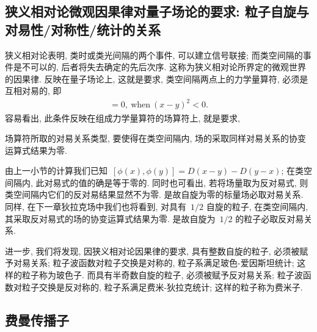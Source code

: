 \subsection{狭义相对论微观因果律对量子场论的要求: 粒子自旋与对易性/对称性/统计的关系}


狭义相对论表明, 类时或类光间隔的两个事件, 可以建立信号联接; 而类空间隔的事件是不可以的, 后者将失去确定的先后次序. 这称为狭义相对论所界定的微观世界的因果律. 反映在量子场论上, 这就是要求, 类空间隔两点上的力学量算符, 必须是互相对易的, 即
\begin{align}
[\mathcal{O}(x),\mathcal{O}(y)]=0,~\textrm{when}~(x-y)^2<0.
\end{align}
容易看出, 此条件反映在组成力学量算符的场算符上, 就是要求,
\begin{center}
场算符所取的对易关系类型, 要使得在类空间隔内, 场的采取同样对易关系的协变运算式结果为零.
\end{center}

由上一小节的计算我们已知~$[\phi(x),\phi(y)]=D(x-y)-D(y-x)$; 在类空间隔内, 此对易式的值的确是等于零的. 同时也可看出, 若将场量取为反对易式, 则类空间隔内它们的反对易结果显然不为零. 是故自旋为零的标量场必取对易关系. 同样, 在下一章狄拉克场中我们也将看到, 对具有~$1/2$ 自旋的粒子, 在类空间隔内, 其采取反对易式的场的协变运算式结果为零. 是故自旋为~$1/2$ 的粒子必取反对易关系.

进一步, 我们将发现, 因狭义相对论因果律的要求, 具有整数自旋的粒子, 必须被赋予对易关系; 粒子波函数对粒子交换是对称的, 粒子系满足玻色-爱因斯坦统计; 这样的粒子称为玻色子. 而具有半奇数自旋的粒子, 必须被赋予反对易关系; 粒子波函数对粒子交换是反对称的, 粒子系满足费米-狄拉克统计; 这样的粒子称为费米子.




\subsection{费曼传播子}

